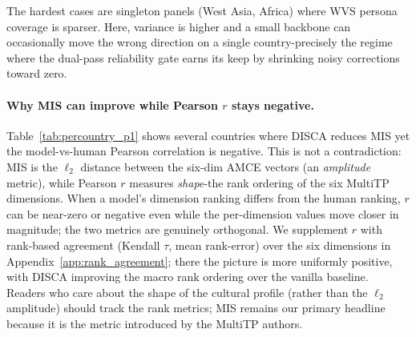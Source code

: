 \documentclass{article}
\begin{document}
The hardest cases are singleton panels (West Asia, Africa) where WVS persona coverage
is sparser.
Here, variance is higher and a small backbone can occasionally move the wrong
direction on a single country-precisely the regime where the dual-pass reliability
gate earns its keep by shrinking noisy corrections toward zero.

\paragraph{Why MIS can improve while Pearson $r$ stays negative.}
Table~\ref{tab:percountry_p1} shows several countries where DISCA
reduces MIS yet the model-vs-human Pearson correlation is negative. This
is not a contradiction: MIS is the $\ell_2$ distance between the six-dim
AMCE vectors (an \emph{amplitude} metric), while Pearson $r$ measures
\emph{shape}-the rank ordering of the six MultiTP dimensions. When a
model's dimension ranking differs from the human ranking, $r$ can be
near-zero or negative even while the per-dimension values move closer in
magnitude; the two metrics are genuinely orthogonal. We supplement $r$
with rank-based agreement (Kendall $\tau$, mean rank-error) over the
six dimensions in Appendix~\ref{app:rank_agreement}; there the picture
is more uniformly positive, with DISCA improving the macro rank
ordering over the vanilla baseline. Readers who care about the shape
of the cultural profile (rather than the $\ell_2$ amplitude) should
track the rank metrics; MIS remains our primary headline because it is
the metric introduced by the MultiTP authors.
\end{document}
